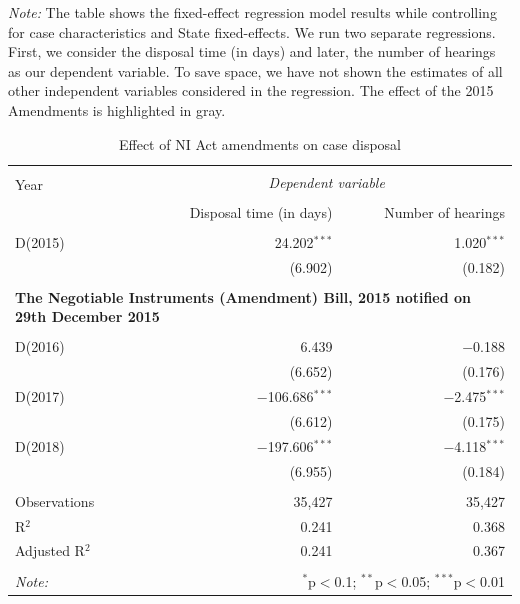 \documentclass[12pt,a4paper]{article}
\begin{document}
\begin{table}[ht]
\centering
\caption{Effect of NI Act amendments on case
disposal}\label{tab:amendments_effect}
\footnotesize
\textit{Note:} The table shows the fixed-effect regression model results while controlling for case characteristics and State fixed-effects. We run two separate regressions. First, we consider the disposal time (in days) and later, the number of hearings as our dependent variable. To save space, we have not shown the estimates of all other independent variables considered in the regression. The effect of the 2015 Amendments is highlighted in gray.

\begin{tabular}{@{\extracolsep{5pt}}lrr}
\\[-1.8ex]
\hline \\[-1.8ex]
\multirow{2}{*}{Year} & \multicolumn{2}{c}{\textit{Dependent variable}} \\
\cline{2-3}
\\[-1.8ex] & Disposal time (in days) & Number of hearings \\
\hline \\[-1.8ex]
D(2015) & 24.202$^{***}$ & 1.020$^{***}$ \\
& (6.902) & (0.182) \\
& & \\
\multicolumn{3}{l}{\textbf{The Negotiable Instruments (Amendment) Bill, 2015 notified on 29th December 2015}}\\
& & \\
D(2016) & 6.439 & $-$0.188 \\
& (6.652) & (0.176) \\
\rowcolor{lightgray}
D(2017) & $-$106.686$^{***}$ & $-$2.475$^{***}$ \\
& (6.612) & (0.175) \\
\rowcolor{lightgray}
D(2018) & $-$197.606$^{***}$ & $-$4.118$^{***}$ \\
& (6.955) & (0.184) \\
\hline \\[-1.8ex]
Observations & 35,427 & 35,427 \\
R$^{2}$ & 0.241 & 0.368 \\
Adjusted R$^{2}$ & 0.241 & 0.367 \\
\hline \\[-1.8ex]
\textit{Note:} & \multicolumn{2}{r}{$^{*}$p$<$0.1; $^{**}$p$<$0.05; $^{***}$p$<$0.01} \\
\end{tabular}
\end{table}
\end{document}
